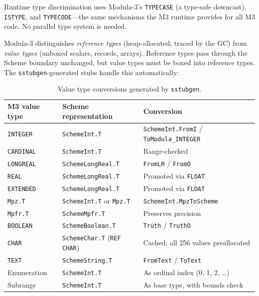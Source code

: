 \documentclass[11pt]{article}
\begin{document}
Runtime type discrimination uses Modula-3's \texttt{TYPECASE} (a
type-safe downcast), \texttt{ISTYPE}, and \texttt{TYPECODE}---the
same mechanisms the M3 runtime provides for all M3 code.  No parallel
type system is needed.

Modula-3 distinguishes \emph{reference types} (heap-allocated, traced
by the GC) from \emph{value types} (unboxed scalars, records,
arrays).  Reference types pass through the Scheme boundary unchanged,
but value types must be boxed into reference types.  The
\texttt{sstubgen}-generated stubs handle this automatically:

\begin{table}[ht]
\centering
\small
\begin{tabular}{@{}lll@{}}
\toprule
M3 value type & Scheme representation & Conversion \\
\midrule
\texttt{INTEGER}     & \texttt{SchemeInt.T}      & \texttt{SchemeInt.FromI} / \texttt{ToModula\_INTEGER} \\
\texttt{CARDINAL}    & \texttt{SchemeInt.T}      & Range-checked \\
\texttt{LONGREAL}    & \texttt{SchemeLongReal.T} & \texttt{FromLR} / \texttt{FromO} \\
\texttt{REAL}        & \texttt{SchemeLongReal.T} & Promoted via \texttt{FLOAT} \\
\texttt{EXTENDED}    & \texttt{SchemeLongReal.T} & Promoted via \texttt{FLOAT} \\
\texttt{Mpz.T}      & \texttt{SchemeInt.T} or \texttt{Mpz.T} & \texttt{SchemeInt.MpzToScheme} \\
\texttt{Mpfr.T}     & \texttt{SchemeMpfr.T}     & Preserves precision \\
\texttt{BOOLEAN}     & \texttt{SchemeBoolean.T}  & \texttt{Truth} / \texttt{TruthO} \\
\texttt{CHAR}        & \texttt{SchemeChar.T} (\texttt{REF CHAR}) & Cached; all 256 values preallocated \\
\texttt{TEXT}        & \texttt{SchemeString.T}   & \texttt{FromText} / \texttt{ToText} \\
Enumeration          & \texttt{SchemeInt.T}      & As ordinal index (0, 1, 2, \ldots) \\
Subrange             & \texttt{SchemeInt.T}      & As base type, with bounds check \\
\bottomrule
\end{tabular}
\caption{Value type conversions generated by \texttt{sstubgen}.}
\label{tab:value-types}
\end{table}
\end{document}
